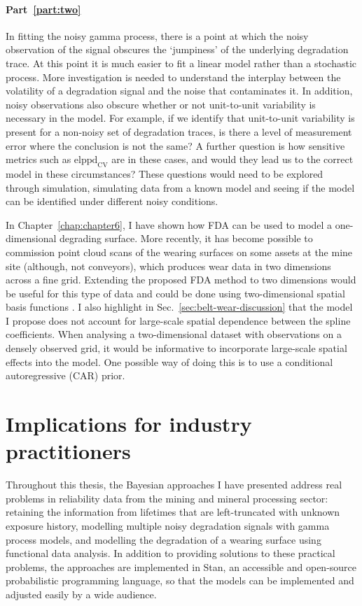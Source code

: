 \paragraph*{Part~\ref{part:two}} In fitting the noisy gamma process, there is a point at which the noisy observation of the signal obscures the `jumpiness' of the underlying degradation trace. At this point it is much easier to fit a linear model rather than a stochastic process. More investigation is needed to understand the interplay between the volatility of a degradation signal and the noise that contaminates it. In addition, noisy observations also obscure whether or not unit-to-unit variability is necessary in the model. For example, if we identify that unit-to-unit variability is present for a non-noisy set of degradation traces, is there a level of measurement error where the conclusion is not the same? A further question is how sensitive metrics such as $\mbox{elppd}_{\text{CV}}$ are in these cases, and would they lead us to the correct model in these circumstances? These questions would need to be explored through simulation, simulating data from a known model and seeing if the model can be identified under different noisy conditions.

In Chapter~\ref{chap:chapter6}, I have shown how FDA can be used to model a one-dimensional degrading surface. More recently, it has become possible to commission point cloud scans of the wearing surfaces on some assets at the mine site (although, not conveyors), which produces wear data in two dimensions across a fine grid. Extending the proposed FDA method to two dimensions would be useful for this type of data and could be done using two-dimensional spatial basis functions \citep[p.~84]{wikle_2019}. I also highlight in Sec.~\ref{sec:belt-wear-discussion} that the model I propose does not account for large-scale spatial dependence between the spline coefficients. When analysing a two-dimensional dataset with observations on a densely observed grid, it would be informative to incorporate large-scale spatial effects into the model. One possible way of doing this is to use a conditional autoregressive (CAR) prior.

\section{Implications for industry practitioners} \label{sec:thesis-practical}

Throughout this thesis, the Bayesian approaches I have presented address real problems in reliability data from the mining and mineral processing sector: retaining the information from lifetimes that are left-truncated with unknown exposure history, modelling multiple noisy degradation signals with gamma process models, and modelling the degradation of a wearing surface using functional data analysis. In addition to providing solutions to these practical problems, the approaches are implemented in Stan, an accessible and open-source probabilistic programming language, so that the models can be implemented and adjusted easily by a wide audience.

